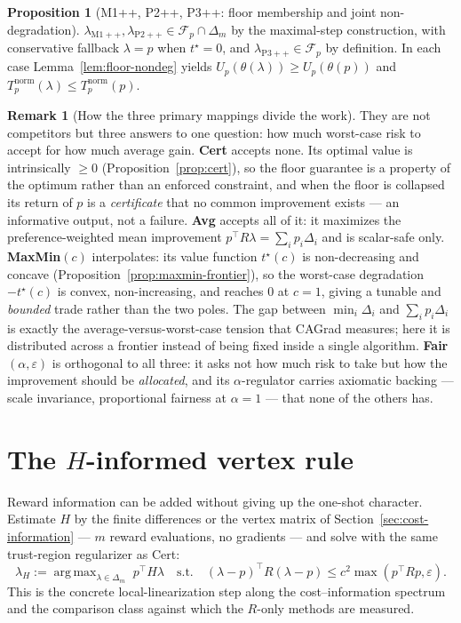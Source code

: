 \documentclass[12pt,a4paper]{report}
\newcommand{\1}{\mathbf{1}}
\newcommand{\Floor}{\mathcal{F}_{p}}
\DeclareMathOperator*{\argmax}{arg\,max}
\theoremstyle{definition}
\newtheorem{remark}[definition]{Remark}
\newtheorem{proposition}[definition]{Proposition}
\begin{document}
\begin{proposition}[M1++, P2++, P3++: floor membership and joint non-degradation]
\label{prop:retired-floor}
\(\lambda_{\mathrm{M1++}},\lambda_{\mathrm{P2++}}\in\Floor\cap\Delta_m\) by the maximal-step construction, with conservative fallback \(\lambda=p\) when \(t^\star=0\), and \(\lambda_{\mathrm{P3++}}\in\Floor\) by definition. In each case Lemma~\ref{lem:floor-nondeg} yields \(U_p(\theta(\lambda))\ge U_p(\theta(p))\) and \(T_p^{\mathrm{norm}}(\lambda)\le T_p^{\mathrm{norm}}(p)\).
\end{proposition}

\begin{remark}[How the three primary mappings divide the work]
\label{rem:division-of-work}
They are not competitors but three answers to one question: how much worst-case risk to accept for how much average gain. \textbf{Cert} accepts none. Its optimal value is intrinsically \(\ge0\) (Proposition~\ref{prop:cert}), so the floor guarantee is a property of the optimum rather than an enforced constraint, and when the floor is collapsed its return of \(p\) is a \emph{certificate} that no common improvement exists --- an informative output, not a failure. \textbf{Avg} accepts all of it: it maximizes the preference-weighted mean improvement \(p^\top R\lambda=\sum_i p_i\Delta_i\) and is scalar-safe only. \textbf{MaxMin\((c)\)} interpolates: its value function \(t^\star(c)\) is non-decreasing and concave (Proposition~\ref{prop:maxmin-frontier}), so the worst-case degradation \(-t^\star(c)\) is convex, non-increasing, and reaches \(0\) at \(c=1\), giving a tunable and \emph{bounded} trade rather than the two poles. The gap between \(\min_i\Delta_i\) and \(\sum_i p_i\Delta_i\) is exactly the average-versus-worst-case tension that CAGrad measures; here it is distributed across a frontier instead of being fixed inside a single algorithm. \textbf{Fair\((\alpha,\varepsilon)\)} is orthogonal to all three: it asks not how much risk to take but how the improvement should be \emph{allocated}, and its \(\alpha\)-regulator carries axiomatic backing --- scale invariance, proportional fairness at \(\alpha=1\) --- that none of the others has.
\end{remark}

\section{The \(H\)-informed vertex rule}
\label{sec:h-rule}

Reward information can be added without giving up the one-shot character. Estimate \(H\) by the finite differences or the vertex matrix of Section~\ref{sec:cost-information} --- \(m\) reward evaluations, no gradients --- and solve with the same trust-region regularizer as Cert:
\[
\lambda_H:=\argmax_{\lambda\in\Delta_m}\;p^\top H\lambda
\quad\text{s.t.}\quad
(\lambda-p)^\top R(\lambda-p)\le c^2\max(p^\top Rp,\varepsilon).
\]
This is the concrete local-linearization step along the cost--information spectrum and the comparison class against which the \(R\)-only methods are measured.
\end{document}
